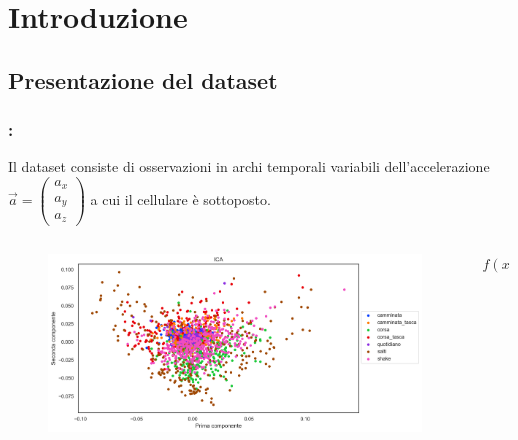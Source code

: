 \documentclass[beamer]{standalone}
\begin{document}
\section{Introduzione}
\subsection{Presentazione del dataset}
\begin{frame}
\frametitle{\secname : \subsecname}
Il dataset consiste di osservazioni in archi temporali variabili dell'accelerazione $\vec{a} = \begin{pmatrix}
a_x \\ a_y \\ a_z
\end{pmatrix}$ a cui il cellulare è sottoposto.
\end{frame}

\begin{frame}

\begin{columns}[T] %
\begin{column}{.48\textwidth}
\begin{figure}[H]
\includegraphics[width=\textwidth]{../figure/ICA.png}
\end{figure}
\end{column}%
\hfill%
\begin{column}{.48\textwidth}
$f(x)=x^2$
\end{column}%
\end{columns}
\end{frame}
\end{document}

